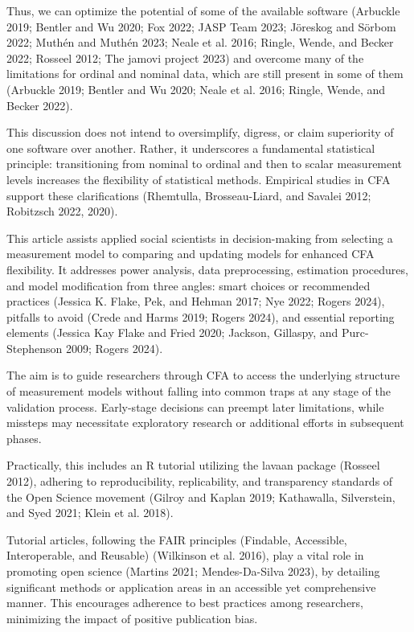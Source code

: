 \documentclass[
  a4paper,
]{article}
\begin{document}
Thus, we can optimize the potential of some of the available software
(Arbuckle 2019; Bentler and Wu 2020; Fox 2022; JASP Team 2023; Jöreskog
and Sörbom 2022; Muthén and Muthén 2023; Neale et al. 2016; Ringle,
Wende, and Becker 2022; Rosseel 2012; The jamovi project 2023) and
overcome many of the limitations for ordinal and nominal data, which are
still present in some of them (Arbuckle 2019; Bentler and Wu 2020; Neale
et al. 2016; Ringle, Wende, and Becker 2022).

This discussion does not intend to oversimplify, digress, or claim
superiority of one software over another. Rather, it underscores a
fundamental statistical principle: transitioning from nominal to ordinal
and then to scalar measurement levels increases the flexibility of
statistical methods. Empirical studies in CFA support these
clarifications (Rhemtulla, Brosseau-Liard, and Savalei 2012; Robitzsch
2022, 2020).

This article assists applied social scientists in decision-making from
selecting a measurement model to comparing and updating models for
enhanced CFA flexibility. It addresses power analysis, data
preprocessing, estimation procedures, and model modification from three
angles: smart choices or recommended practices (Jessica K. Flake, Pek,
and Hehman 2017; Nye 2022; Rogers 2024), pitfalls to avoid (Crede and
Harms 2019; Rogers 2024), and essential reporting elements (Jessica Kay
Flake and Fried 2020; Jackson, Gillaspy, and Purc-Stephenson 2009;
Rogers 2024).

The aim is to guide researchers through CFA to access the underlying
structure of measurement models without falling into common traps at any
stage of the validation process. Early-stage decisions can preempt later
limitations, while missteps may necessitate exploratory research or
additional efforts in subsequent phases.

Practically, this includes an R tutorial utilizing the lavaan package
(Rosseel 2012), adhering to reproducibility, replicability, and
transparency standards of the Open Science movement (Gilroy and Kaplan
2019; Kathawalla, Silverstein, and Syed 2021; Klein et al. 2018).

Tutorial articles, following the FAIR principles (Findable, Accessible,
Interoperable, and Reusable) (Wilkinson et al. 2016), play a vital role
in promoting open science (Martins 2021; Mendes-Da-Silva 2023), by
detailing significant methods or application areas in an accessible yet
comprehensive manner. This encourages adherence to best practices among
researchers, minimizing the impact of positive publication bias.
\end{document}
